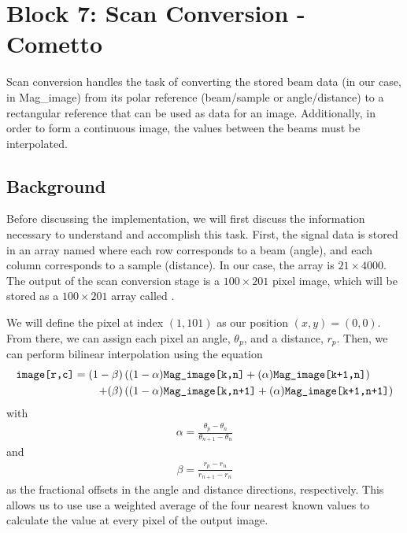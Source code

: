
\section{Block 7: Scan Conversion - Cometto}

Scan conversion handles the task of converting the stored beam data (in our case, in Mag\_image) from its polar reference (beam/sample or angle/distance) to a rectangular reference that can be used as data for an image.  Additionally, in order to form a continuous image, the values between the beams must be interpolated.

\subsection{Background}

Before discussing the implementation, we will first discuss the information necessary to understand and accomplish this task.  First, the signal data is stored in an array named  where each row corresponds to a beam (angle), and each column corresponds to a sample (distance).  In our case, the array is $21 \times 4000$.  The output of the scan conversion stage is a $100 \times 201$ pixel image, which will be stored as a $100 \times 201$ array called .

We will define the pixel at index $(1,101)$ as our position $(x,y) = (0,0)$.  From there, we can assign each pixel an angle, $\theta_p$, and a distance, $r_p$.  Then, we can perform bilinear interpolation using the equation
\begin{align*}
    \texttt{image[r,c]} = (1-\beta) &\left( (1 - \alpha) \texttt{Mag\_image[k,n]} + (\alpha) \texttt{Mag\_image[k+1,n]}  \right) \\ 
    + (\beta) &\left( (1-\alpha) \texttt{Mag\_image[k,n+1]} + (\alpha) \texttt{Mag\_image[k+1,n+1]} \right)
\end{align*}
with
\begin{align*}
    \alpha = \frac{\theta_p - \theta_n}{\theta_{n+1} - \theta_n}
\end{align*}
and
\begin{align*}
    \beta = \frac{r_p - r_n}{r_{n+1} - r_n}
\end{align*}
as the fractional offsets in the angle and distance directions, respectively.  This allows us to use use a weighted average of the four nearest known values to calculate the value at every pixel of the output image.

